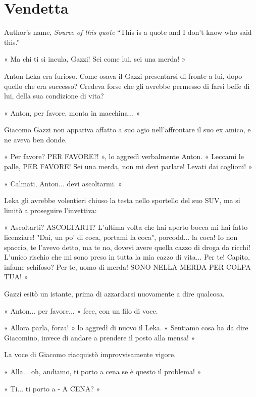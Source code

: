 \chapter{Vendetta}

\begin{chapquote}{Author's name, \textit{Source of this quote}}
``This is a quote and I don't know who said this.''
\end{chapquote}


« Ma chi ti si incula, Gazzi! Sei come lui, sei una merda! »

Anton Leka era furioso. Come osava il Gazzi presentarsi di fronte a lui, dopo quello che era successo? Credeva forse che gli avrebbe permesso di farsi beffe di lui, della sua condizione di vita?

« Anton, per favore, monta in macchina... »

Giacomo Gazzi non appariva affatto a suo agio nell'affrontare il suo ex amico, e ne aveva ben donde.

« Per favore? PER FAVORE?! », lo aggredì verbalmente Anton. « Leccami le palle, PER FAVORE! Sei una merda, non mi devi parlare! Levati dai coglioni! »

« Calmati, Anton... devi ascoltarmi. »

Leka gli avrebbe volentieri chiuso la testa nello sportello del suo SUV, ma si limitò a proseguire l'invettiva: 

« Ascoltarti? ASCOLTARTI? L'ultima volta che hai aperto bocca mi hai fatto licenziare! "Dai, un po' di coca, portami la coca", porcodd... la coca! Io non spaccio, te l'avevo detto, ma te no, dovevi avere quella cazzo di droga da ricchi! L'unico rischio che mi sono preso in tutta la mia cazzo di vita... Per te! Capito, infame schifoso? Per te, uomo di merda! SONO NELLA MERDA PER COLPA TUA! »

Gazzi esitò un istante, prima di azzardarsi nuovamente a dire qualcosa.

« Anton... per favore... » fece, con un filo di voce.

« Allora parla, forza! » lo aggredì di nuovo il Leka. « Sentiamo cosa ha da dire Giacomino, invece di andare a prendere il posto alla mensa! »

La voce di Giacomo riacquistò improvvisamente vigore.

« Alla... oh, andiamo, ti porto a cena se è questo il problema! »

« Ti... ti porto a - A CENA? »

